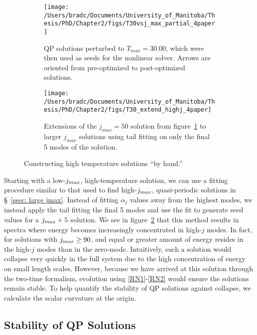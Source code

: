 \documentclass[../PhD.tex]{subfiles}
\begin{document}
\begin{figure}[h]
	\centering
	\begin{subfigure}[t]{0.45\textwidth}
		\texttt{[image: /Users/bradc/Documents/University\_of\_Manitoba/Thesis/PhD/Chapter2/figs/T30vsj\_max\_partial\_4paper]}
		\caption{QP solutions perturbed to $T_{max}=30.00$, which were then used as seeds for the nonlinear solver. Arrows are oriented from pre-optimized to post-optimized solutions.}
		\label{fig: T30 vs j_max}
	\end{subfigure}
	\;
	\begin{subfigure}[t]{0.45\textwidth}
		\texttt{[image: /Users/bradc/Documents/University\_of\_Manitoba/Thesis/PhD/Chapter2/figs/T30\_extend\_highj\_4paper]}
		\caption{Extensions of the $j_{max}=50$ solution from figure~\ref{fig: T30 vs j_max} to larger $j_{max}$ solutions using tail fitting on only the final 5 modes of the solution.}
		\label{fig: manual highT}
	\end{subfigure}
	\caption[Constructing high temperature solutions by hand]{Constructing high temperature solutions ``by hand.''}
	\label{fig: making highT}
\end{figure}

Starting with a low-$j_{max}$, high-temperature solution, we can use a fitting procedure similar to that used to find high-$j_{max}$, quasi-periodic solutions in \S~\!\ref{ssec: large jmax}. Instead of fitting $\alpha_j$ values away from the highest modes, we instead apply the tail fitting the final 5 modes and use the fit to generate seed values for a $j_{max} + 5$ solution. We see in figure~\ref{fig: manual highT} that this method results in spectra where energy becomes increasingly concentrated in high-$j$ modes. In fact, for solutions with $j_{max} \geq 90$, and equal or greater amount of energy resides in the high-$j$ modes than in the zero-mode. Intuitively, such a solution would collapse very quickly in the full system due to the high concentration of energy on small length scales. However, because we have arrived at this solution through the two-time formalism, evolution using \eqref{RN1}-\eqref{RN2} would ensure the solutions remain stable. To help quantify the stability of QP solutions against collapse, we calculate the scalar curvature at the origin. 


\subsection{Stability of QP Solutions}
\end{document}
